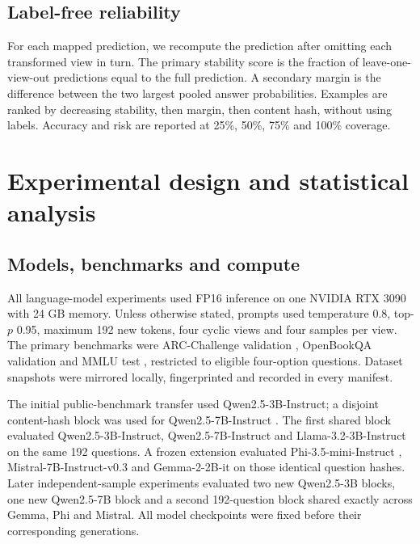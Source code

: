 \documentclass[11pt]{article}
\begin{document}
\subsection{Label-free reliability}

For each mapped prediction, we recompute the prediction after omitting each transformed view in turn. The primary stability score is the fraction of leave-one-view-out predictions equal to the full prediction. A secondary margin is the difference between the two largest pooled answer probabilities. Examples are ranked by decreasing stability, then margin, then content hash, without using labels. Accuracy and risk are reported at 25\%, 50\%, 75\% and 100\% coverage.

\section{Experimental design and statistical analysis}

\subsection{Models, benchmarks and compute}

All language-model experiments used FP16 inference on one NVIDIA RTX 3090 with 24 GB memory. Unless otherwise stated, prompts used temperature 0.8, top-$p$ 0.95, maximum 192 new tokens, four cyclic views and four samples per view. The primary benchmarks were ARC-Challenge validation \citep{clark2018arc}, OpenBookQA validation \citep{mihaylov2018openbookqa} and MMLU test \citep{hendrycks2021mmlu}, restricted to eligible four-option questions. Dataset snapshots were mirrored locally, fingerprinted and recorded in every manifest.

The initial public-benchmark transfer used Qwen2.5-3B-Instruct; a disjoint content-hash block was used for Qwen2.5-7B-Instruct \citep{qwen2025technical}. The first shared block evaluated Qwen2.5-3B-Instruct, Qwen2.5-7B-Instruct and Llama-3.2-3B-Instruct \citep{dubey2024llama} on the same 192 questions. A frozen extension evaluated Phi-3.5-mini-Instruct \citep{abdin2024phi}, Mistral-7B-Instruct-v0.3 \citep{jiang2023mistral} and Gemma-2-2B-it \citep{team2024gemma2} on those identical question hashes. Later independent-sample experiments evaluated two new Qwen2.5-3B blocks, one new Qwen2.5-7B block and a second 192-question block shared exactly across Gemma, Phi and Mistral. All model checkpoints were fixed before their corresponding generations.
\end{document}
